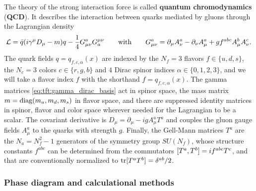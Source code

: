 The theory of the strong interaction force is called \textbf{quantum chromodynamics} (\textbf{QCD}).
It describes the interaction between quarks mediated by gluons through the Lagrangian density
\begin{equation}
	\mathcal{L} = \bar{q} ( i \gamma^\mu D_\mu - m ) q - \frac14 G_{\mu\nu}^a G^{\mu\nu}_a
	\qquad \text{with} \qquad
	G_{\mu\nu}^a = \partial_\mu A_\nu^a - \partial_\nu A_\mu^a + g f^{abc} A_\mu^b A_\nu^c.
\label{eq:qcd:lagrangian}
\end{equation}
The quark fields $q = q_{f,c,\alpha}(x)$ are indexed by
the $N_f = 3$ flavors $f \in \{u,d,s\}$,
the $N_c = 3$ colors $c \in \{r,g,b\}$ and
$4$ Dirac spinor indices $\alpha \in \{0,1,2,3\}$,
and we will take a flavor index $f$ with the shorthand $f = q_{f,c,\alpha}(x)$.
The gamma matrices \eqref{eq:tft:gamma_dirac_basis} act in spinor space,
the mass matrix $m = \operatorname{diag}(m_u, m_d, m_s)$ in flavor space,
and there are suppressed identity matrices in spinor, flavor and color space wherever needed for the Lagrangian to be a scalar.
The covariant derivative is $D_\mu = \partial_\mu - i g A_\mu^a T^a$ and couples the gluon gauge fields $A_\mu^a$ to the quarks with strength $g$.
Finally, the Gell-Mann matrices $T^a$ are the $N_a = N_f^2 - 1$ generators of the symmetry group $SU(N_f)$,
whose structure constants $f^{abc}$ can be determined from the commutators $[ T^a , T^b ] = i f^{abc} T^c$,
and that are conventionally normalized to $\operatorname{tr}[T^a T^b] = \delta^{ab}/2$.


\subsubsection{Phase diagram and calculational methods}

